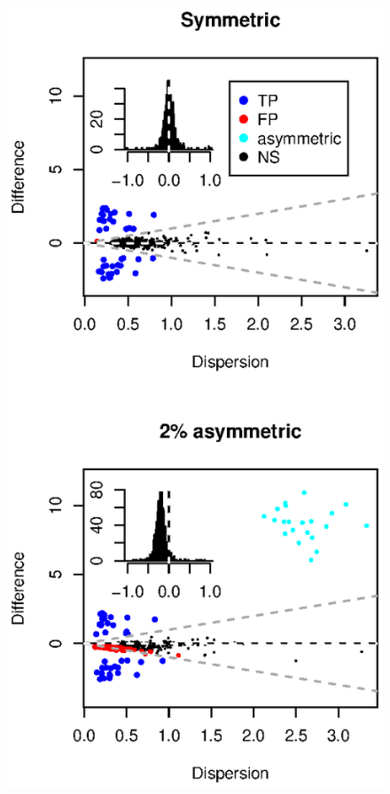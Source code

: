 \documentclass[graybox]{svmult}
\providecommand{\DIFdelend}{} %
\begin{document}
\DIFdelend %
%
\begin{figure}[b]
\sidecaption[t]
\includegraphics[scale=.65]{Fig_1-book.eps}

\end{figure}
\end{document}
